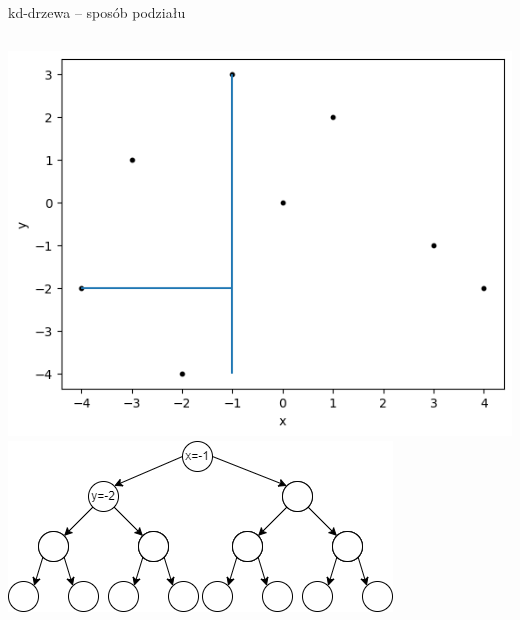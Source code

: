 \documentclass[aspectratio=169,dvipsnames]{beamer}
\begin{document}
\begin{frame}{kd-drzewa -- sposób podziału}
    \begin{columns}
        \includegraphics[width=\textwidth]{images/plots/3}
        \includegraphics[width=\textwidth]{images/trees/3.drawio}
    \end{columns}
\end{frame}
\end{document}
